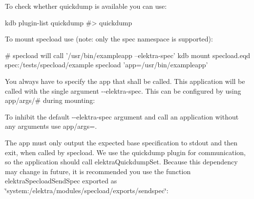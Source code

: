 To check whether {\ttfamily quickdump} is available you can use\+:


\begin{DoxyCode}
kdb plugin-list quickdump
#> quickdump
\end{DoxyCode}


To mount {\ttfamily specload} use (note\+: only the {\ttfamily spec} namespace is supported)\+:


\begin{DoxyCode}
# specload will call '/usr/bin/exampleapp --elektra-spec'
kdb mount specload.eqd spec:/tests/specload/example specload 'app=/usr/bin/exampleapp'
\end{DoxyCode}


You always have to specify the {\ttfamily app} that shall be called. This application will be called with the single argument {\ttfamily -\/-\/elektra-\/spec}. This can be configured by using {\ttfamily app/args/\#} during mounting\+:




To inhibit the default {\ttfamily -\/-\/elektra-\/spec} argument and call an application without any arguments use {\ttfamily \textquotesingle{}app/args=\textquotesingle{}}.

The app must only output the expected base specification to {\ttfamily stdout} and then exit, when called by {\ttfamily specload}. We use the {\ttfamily quickdump} plugin for communication, so the application should call {\ttfamily elektra\+Quickdump\+Set}. Because this dependency may change in future, it is recommended you use the function {\ttfamily elektra\+Specload\+Send\+Spec} exported as {\ttfamily \char`\"{}system\+:/elektra/modules/specload/exports/sendspec\char`\"{}}\+:


